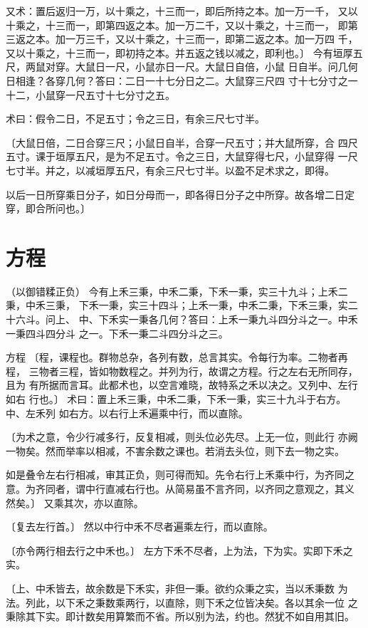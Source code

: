 \documentclass[12pt,UTF8]{ctexbook}
\begin{document}
又术：置后返归一万，以十乘之，十三而一，即后所持之本。加一万一千， 又以十乘之，十三而一，即第四返之本。加一万二千，又以十乘之，十三而一， 即第三返之本。加一万三千，又以十乘之，十三而一，即第二返之本。加一万四 千，又以十乘之，十三而一，即初持之本。并五返之钱以减之，即利也。〕 今有垣厚五尺，两鼠对穿。大鼠日一尺，小鼠亦日一尺。大鼠日自倍，小鼠 日自半。问几何日相逢？各穿几何？答曰：二日一十七分日之二。大鼠穿三尺四 寸十七分寸之一十二，小鼠穿一尺五寸十七分寸之五。

术曰：假令二日，不足五寸；令之三日，有余三尺七寸半。

〔大鼠日倍，二日合穿三尺；小鼠日自半，合穿一尺五寸；并大鼠所穿，合 四尺五寸。课于垣厚五尺，是为不足五寸。令之三日，大鼠穿得七尺，小鼠穿得 一尺七寸半。并之，以减垣厚五尺，有余三尺七寸半。以盈不足术求之，即得。

以后一日所穿乘日分子，如日分母而一，即各得日分子之中所穿。故各增二日定 穿，即合所问也。〕

\chapter{方程}
（以御错糅正负） 今有上禾三秉，中禾二秉，下禾一秉，实三十九斗；上禾二秉，中禾三秉， 下禾一秉，实三十四斗；上禾一秉，中禾二秉，下禾三秉，实二十六斗。问上、 中、下禾实一秉各几何？答曰：上禾一秉九斗四分斗之一。中禾一秉四斗四分斗 之一。下禾一秉二斗四分斗之三。

方程 〔程，课程也。群物总杂，各列有数，总言其实。令每行为率。二物者再程， 三物者三程，皆如物数程之。并列为行，故谓之方程。行之左右无所同存，且为 有所据而言耳。此都术也，以空言难晓，故特系之禾以决之。又列中、左行如右 行也。〕 术曰：置上禾三秉，中禾二秉，下禾一秉，实三十九斗于右方。中、左禾列 如右方。以右行上禾遍乘中行，而以直除。

〔为术之意，令少行减多行，反复相减，则头位必先尽。上无一位，则此行 亦阙一物矣。然而举率以相减，不害余数之课也。若消去头位，则下去一物之实。

如是叠令左右行相减，审其正负，则可得而知。先令右行上禾乘中行，为齐同之 意。为齐同者，谓中行直减右行也。从简易虽不言齐同，以齐同之意观之，其义 然矣。〕 又乘其次，亦以直除。

〔复去左行首。〕 然以中行中禾不尽者遍乘左行，而以直除。

〔亦令两行相去行之中禾也。〕 左方下禾不尽者，上为法，下为实。实即下禾之实。

〔上、中禾皆去，故余数是下禾实，非但一秉。欲约众秉之实，当以禾秉数 为法。列此，以下禾之秉数乘两行，以直除，则下禾之位皆决矣。各以其余一位 之秉除其下实。即计数矣用算繁而不省。所以别为法，约也。然犹不如自用其旧。
\end{document}

